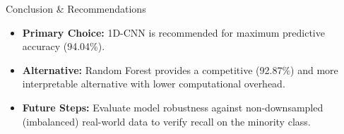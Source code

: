 \documentclass[10pt]{beamer}
\begin{document}
\begin{frame}{Conclusion \& Recommendations}
    \begin{itemize}
        \item \textbf{Primary Choice:} 1D-CNN is recommended for maximum predictive accuracy (94.04\%).
        \item \textbf{Alternative:} Random Forest provides a competitive (92.87\%) and more interpretable alternative with lower computational overhead.
        \item \textbf{Future Steps:} Evaluate model robustness against non-downsampled (imbalanced) real-world data to verify recall on the minority class.
    \end{itemize}
\end{frame}
\end{document}
